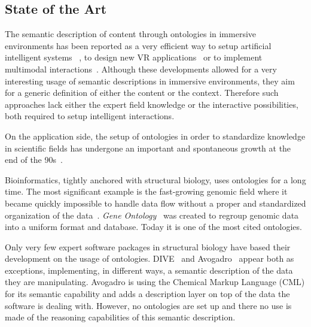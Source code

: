 \documentclass{vgtc}                          %
\begin{document}
\subsection{State of the Art}

The semantic description of content through ontologies in immersive environments has been reported as a very efficient way to setup artificial intelligent systems ~\cite{Wiebusch:2015aa}, to design new VR applications~\cite{kleinermann2005designing} or to implement multimodal interactions~\cite{irawati2005semantic}. Although these developments allowed for a very interesting usage of semantic descriptions in immersive environments, they aim for a generic definition of either the content or the context. Therefore such approaches lack either the expert field knowledge or the interactive possibilities, both required to setup intelligent interactions.

On the application side, the setup of ontologies in order to standardize knowledge in scientific fields has undergone an important and spontaneous growth at the end of the 90s~\cite{schulze-kremer_ontologies_2002}.

Bioinformatics, tightly anchored with structural biology, uses ontologies for a long time. The most significant example is the fast-growing genomic field where it became quickly impossible to handle data flow without a proper and standardized organization of the data~\cite{schuurman_ontologies_2008}. \textit{Gene Ontology}~\cite{ashburner_gene_2000} was created to regroup genomic data into a uniform format and database. Today it is one of the most cited ontologies. 

Only very few expert software packages in structural biology have based their development on the usage of ontologies. DIVE~\cite{rysavy_dive:_2014} and Avogadro~\cite{hanwell2012avogadro} appear both as exceptions, implementing, in different ways, a semantic description of the data they are manipulating. Avogadro is using the Chemical Markup Language (CML) for its semantic capability and adds a description layer on top of the data the software is dealing with. However, no ontologies are set up and there no use is made of the reasoning capabilities of this semantic description. 
\end{document}
